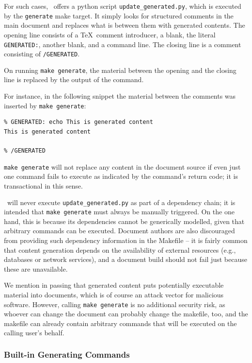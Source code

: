 \documentclass[11pt,a4paper]{ivoa}
\begin{document}
For such cases, \ivoatex\ offers a python script
\texttt{update\_generated.py}, which is executed by the
\texttt{generate} make target.  It simply looks for structured comments
in the main document and replaces what is between them with generated
contents.  The opening line consists of a \TeX~comment introducer, a
blank, the literal \texttt{GENERATED:}, another blank, and a command
line.  The closing line is a comment consisting of \texttt{/GENERATED}.

On running \texttt{make generate}, the material between the opening and
the closing line is replaced by the output of the command.

For instance, in the following snippet the material between the comments
was inserted by \texttt{make generate}:

\begin{lstlisting}
% GENERATED: echo This is generated content
This is generated content

% /GENERATED
\end{lstlisting}

\texttt{make generate} will not replace any content in the document source
if even just one command fails to execute as indicated by the
command's return code; it is transactional in this sense.

\ivoatex~will never execute \texttt{update\_generated.py} as part of a
dependency chain; it is intended that \texttt{make generate} must always
be manually triggered.  On the one hand, this is because its
dependencies cannot be generically modelled, given that arbitrary
commands can be executed.  Document authors are also discouraged from
providing such dependency information in
the Makefile -- it is fairly common that
content generation depends on the availability of external resources
(e.g., databases or network services), and a document build should not
fail just because these are unavailable.

We mention in passing that generated content puts potentially executable
material into documents, which is of course an attack vector for
malicious software.  However, calling \texttt{make generate} is no
additional security risk, as whoever can change the document can
probably change the makefile, too, and the makefile can already contain
arbitrary commands that will be executed on the calling user's behalf.


\subsubsection{Built-in Generating Commands}
\end{document}

